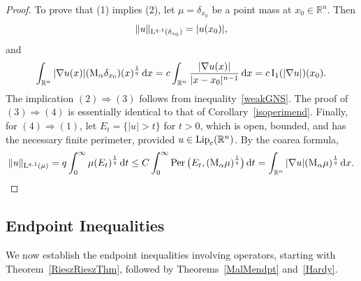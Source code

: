\documentclass[11pt, a4paper, reqno]{amsart}
\newcommand{\R}{\mathbb R}
\newcommand{\al}{\alpha}
\newcommand{\dx}{\,{\mathrm dx}}
\newcommand{\dt}{\,{\mathrm dt}}
\newcommand{\Lup}{\textup{L}}
\DeclareMathOperator{\Lip}{\textup{Lip}}
\DeclareMathOperator{\Per}{\textup{Per}}
\theoremstyle{definition}
\theoremstyle{remark}
\begin{document}
\begin{proof}

To prove that (1) implies (2), let $\mu = \delta_{x_0}$ be a point mass at $x_0 \in \R^n$. Then
\[
\|u\|_{\Lup^{q,1}(\delta_{x_0})}=|u(x_0)|,
\]
and
\begin{equation*}
\int_{\R^n}|\nabla u(x)|(\textup{M}_\al\delta_{x_0})(x)^{\frac1q}\dx
=c\int_{\R^n}\frac{|\nabla u(x)|}{|x-x_0|^{n-1}}\dx
=c\,\textup{I}_1(|\nabla u|)(x_0).
\end{equation*}
The implication $(2)\Rightarrow(3)$ follows from inequality~\eqref{weakGNS}. The proof of $(3)\Rightarrow(4)$ is essentially identical to that of Corollary~\ref{isoperimend}. Finally, for $(4)\Rightarrow(1)$, let $E_t=\{|u|>t\}$ for $t>0$, which is open, bounded, and has the necessary finite perimeter, provided $u\in \Lip_c(\R^n)$. By the coarea formula,
\[
\|u\|_{\Lup^{q,1}(\mu)}
=q\int_0^\infty \mu(E_t)^{\frac1q}\dt
\le C\int_0^\infty \Per\big(E_t,(\textup{M}_\al\mu)^{{\frac1q}}\big)\dt
=\int_{\R^n}|\nabla u|(\textup{M}_\al\mu)^{\frac1q}\dx.
\]
\end{proof}


\subsection{Endpoint Inequalities}

We now establish the endpoint inequalities involving operators, starting with Theorem~\ref{RieszRieszThm}, followed by Theorems~\ref{MalMendpt} and~\ref{Hardy}.
\end{document}

